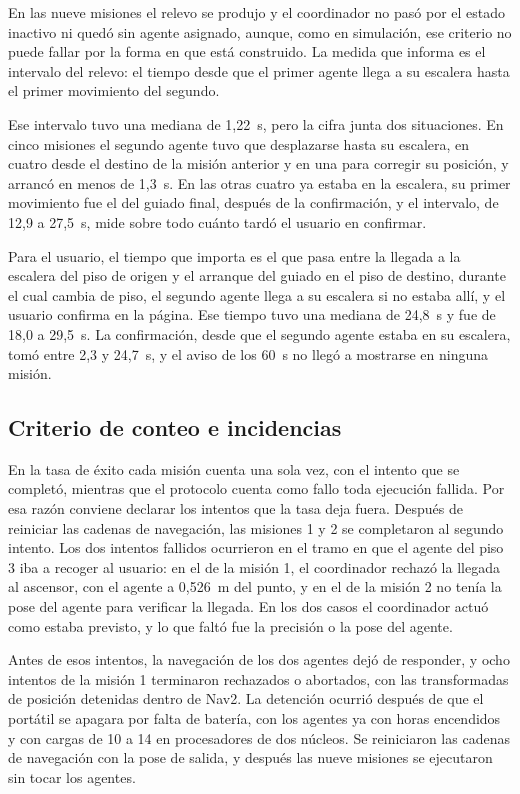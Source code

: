 En las nueve misiones el relevo se produjo y el coordinador no pasó por el estado inactivo ni quedó sin agente asignado, aunque, como en simulación, ese criterio no puede fallar por la forma en que está construido. La medida que informa es el intervalo del relevo: el tiempo desde que el primer agente llega a su escalera hasta el primer movimiento del segundo.

Ese intervalo tuvo una mediana de 1,22~s, pero la cifra junta dos situaciones. En cinco misiones el segundo agente tuvo que desplazarse hasta su escalera, en cuatro desde el destino de la misión anterior y en una para corregir su posición, y arrancó en menos de 1,3~s. En las otras cuatro ya estaba en la escalera, su primer movimiento fue el del guiado final, después de la confirmación, y el intervalo, de 12,9 a 27,5~s, mide sobre todo cuánto tardó el usuario en confirmar.

Para el usuario, el tiempo que importa es el que pasa entre la llegada a la escalera del piso de origen y el arranque del guiado en el piso de destino, durante el cual cambia de piso, el segundo agente llega a su escalera si no estaba allí, y el usuario confirma en la página. Ese tiempo tuvo una mediana de 24,8~s y fue de 18,0 a 29,5~s. La confirmación, desde que el segundo agente estaba en su escalera, tomó entre 2,3 y 24,7~s, y el aviso de los 60~s no llegó a mostrarse en ninguna misión.

\subsection{Criterio de conteo e incidencias}

En la tasa de éxito cada misión cuenta una sola vez, con el intento que se completó, mientras que el protocolo cuenta como fallo toda ejecución fallida. Por esa razón conviene declarar los intentos que la tasa deja fuera. Después de reiniciar las cadenas de navegación, las misiones 1 y 2 se completaron al segundo intento. Los dos intentos fallidos ocurrieron en el tramo en que el agente del piso 3 iba a recoger al usuario: en el de la misión 1, el coordinador rechazó la llegada al ascensor, con el agente a 0,526~m del punto, y en el de la misión 2 no tenía la pose del agente para verificar la llegada. En los dos casos el coordinador actuó como estaba previsto, y lo que faltó fue la precisión o la pose del agente.

Antes de esos intentos, la navegación de los dos agentes dejó de responder, y ocho intentos de la misión 1 terminaron rechazados o abortados, con las transformadas de posición detenidas dentro de Nav2. La detención ocurrió después de que el portátil se apagara por falta de batería, con los agentes ya con horas encendidos y con cargas de 10 a 14 en procesadores de dos núcleos. Se reiniciaron las cadenas de navegación con la pose de salida, y después las nueve misiones se ejecutaron sin tocar los agentes.

